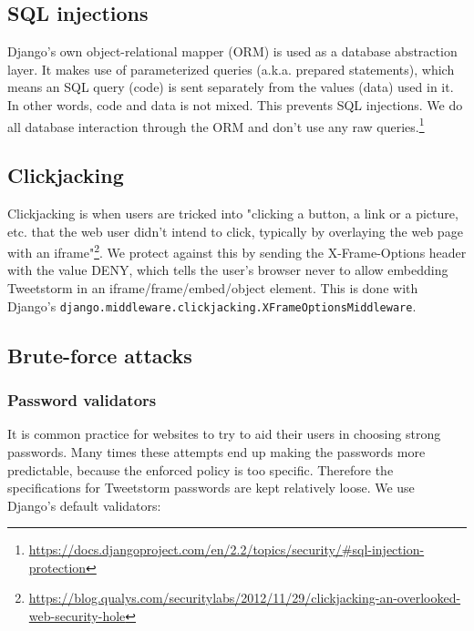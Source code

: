 \documentclass[11pt,english]{article}
\begin{document}
\subsection{SQL injections}

Django's own object-relational mapper (ORM) is used as a database abstraction layer. It makes use of parameterized queries (a.k.a. prepared statements), which means an SQL query (code) is sent separately from the values (data) used in it. In other words, code and data is not mixed. This prevents SQL injections. We do all database interaction through the ORM and don’t use any raw queries.\footnote{\url{https://docs.djangoproject.com/en/2.2/topics/security/\#sql-injection-protection}}

\subsection{Clickjacking}

Clickjacking is when users are tricked into "clicking a button, a link or a picture, etc. that the web user didn’t intend to click, typically by overlaying the web page with an iframe"\footnote{\url{https://blog.qualys.com/securitylabs/2012/11/29/clickjacking-an-overlooked-web-security-hole}}. We protect against this by sending the X-Frame-Options header with the value DENY, which tells the user’s browser never to allow embedding Tweetstorm in an iframe/frame/embed/object element. This is done with Django’s \lstinline{django.middleware.clickjacking.XFrameOptionsMiddleware}.

\subsection{Brute-force attacks}

\subsubsection{Password validators}

It is common practice for websites to try to aid their users in choosing strong passwords. Many times these attempts end up making the passwords more predictable, because the enforced policy is too specific. Therefore the specifications for Tweetstorm passwords are kept relatively loose. We use Django’s default validators:
\end{document}
